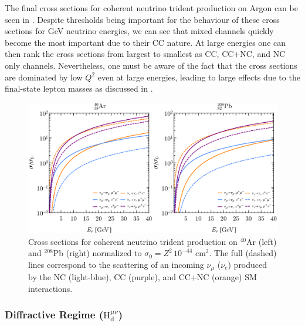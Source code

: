 The final cross sections for coherent neutrino trident production on Argon can be seen in . Despite thresholds being important for the behaviour of these cross sections for GeV neutrino energies, we can see that mixed channels quickly become the most important due to their CC nature. At large energies one can then rank the cross sections from largest to smallest as CC, CC+NC, and NC only channels. Nevertheless, one must be aware of the fact that the cross sections are dominated by low $Q^2$ even at large energies, leading to large effects due to the final-state lepton masses as discussed in \cite{Magill:2016hgc}.

\begin{figure}[t]
\centering
\includegraphics[width=\textwidth]{figs/Xsec_4PS_coh.pdf}
\caption{Cross sections for coherent neutrino trident production on $^{40}$Ar (left) and  $^{208}$Pb (right) normalized to $\sigma_0 =  Z^2\, 10^{-44}$ cm$^2$. The full (dashed) lines correspond to the scattering of an incoming $\nu_\mu$ ($\nu_e$) produced by the NC (light-blue), CC (purple), and CC+NC (orange) SM interactions. \label{fig:coh_xsec}}
\end{figure}


\subsubsection{Diffractive Regime ($\mathrm{H}^{\mu\nu}_\mathrm{d}$)}

